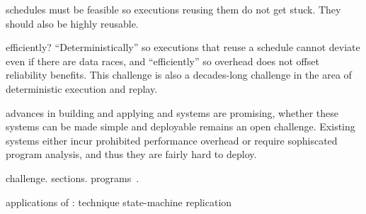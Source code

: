 
schedules must be feasible so executions reusing them do not get stuck. They
should also be highly reusable.

efficiently?  ``Deterministically'' so executions that reuse a schedule cannot
deviate even if there are data races, and ``efficiently'' so overhead does not
offset reliability benefits. This challenge is also a decades-long challenge in
the area of deterministic execution and replay.

advances in building and applying \smt and \dmt systems are promising, whether
these systems can be made simple and deployable remains an open challenge.
Existing systems either incur prohibited performance overhead or require
sophiscated program analysis, and thus they are fairly hard to deploy.


challenge.
sections.
programs~\cite{dthreads:sosp11}.

applications of \smt: 
technique 
state-machine replication


